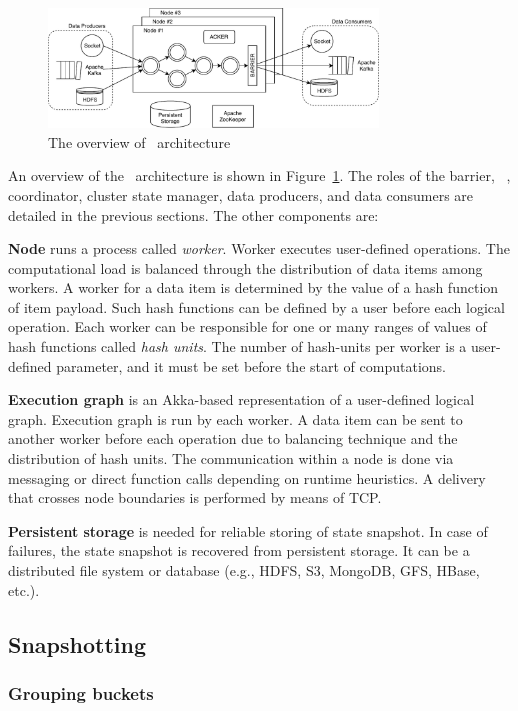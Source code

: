 \begin{figure}[htbp]
  \centering
  \includegraphics[width=0.78\textwidth]{pics/arch}
  \caption{The overview of \FlameStream\ architecture}
  \label {arch}
\end{figure}

An overview of the \FlameStream\ architecture is shown in Figure~\ref{arch}. The roles of the barrier, \Acker\ , coordinator, cluster state manager, data producers, and data consumers are detailed in the previous sections. The other components are:

{\bf Node} runs a process called {\it worker}. Worker executes user-defined operations. The computational load is balanced through the distribution of data items among workers. A worker for a data item is determined by the value of a hash function of item payload. Such hash functions can be defined by a user before each logical operation. Each worker can be responsible for one or many ranges of values of hash functions called {\it hash units}. The number of hash-units per worker is a user-defined parameter, and it must be set before the start of computations. 

{\bf Execution graph} is an Akka-based representation of a user-defined logical graph. Execution graph is run by each worker. A data item can be sent to another worker before each operation due to balancing technique and the distribution of hash units. The communication within a node is done via messaging or direct function calls depending on runtime heuristics. A delivery that crosses node boundaries is performed by means of TCP.

{\bf Persistent storage} is needed for reliable storing of state snapshot. In case of failures, the state snapshot is recovered from persistent storage. It can be a distributed file system or database (e.g., HDFS, S3, MongoDB, GFS, HBase, etc.).

\subsection{Snapshotting}

\subsubsection{Grouping buckets}

